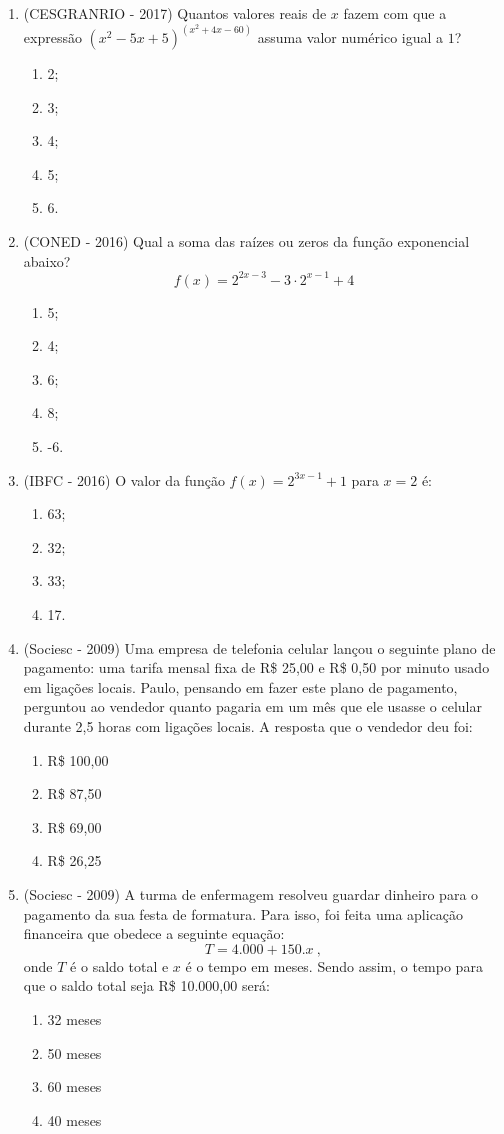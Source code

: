 \begin{enumerate}
\item (CESGRANRIO - 2017) Quantos valores reais de $x$ fazem com que a expressão $(x^2 - 5x + 5)^{(x^2 + 4x - 60)}$ assuma valor numérico igual a $1$? 
\begin{enumerate}
\item 2;
\item 3;
\item 4;
\item 5;
\item 6.
\end{enumerate}

\item (CONED - 2016) Qual a soma das raízes ou zeros da função exponencial abaixo? 
\[f(x)= 2^{2x-3} - 3 \cdot 2^{x-1} + 4\]

\begin{enumerate}
\item 5;
\item 4;
\item 6;
\item 8;
\item -6.
\end{enumerate}

\item (IBFC - 2016) O valor da função $f(x) = 2^{3x-1} + 1$ para $x = 2$ é:
\begin{enumerate}
\item 63;
\item 32;
\item 33;
\item 17.
\end{enumerate}
 
 \item (Sociesc - 2009) Uma empresa de telefonia celular lançou o seguinte plano de pagamento: uma tarifa mensal fixa de R\$ 25,00 e R\$ 0,50 por minuto usado em ligações locais. Paulo, pensando em fazer este
 plano de pagamento, perguntou ao vendedor quanto pagaria em um mês que ele usasse o celular durante 2,5 horas com ligações locais. A
 resposta que o vendedor deu foi:
 \begin{enumerate}
  \item R\$ 100,00
  \item R\$ 87,50
  \item R\$ 69,00
  \item R\$ 26,25
 \end{enumerate}
 
 \item (Sociesc - 2009) A turma de enfermagem resolveu guardar dinheiro para o pagamento da sua festa de formatura. Para isso, foi feita uma aplicação financeira que obedece a seguinte equação: 
  \[T = 4.000 + 150.x \ ,\]
  onde $T$ é o saldo total e $x$ é o tempo em meses. Sendo assim, o tempo para que o saldo total seja R\$ 10.000,00 será:
  \begin{enumerate}
  \item 32 meses
  \item 50 meses
  \item 60 meses
  \item 40 meses
 \end{enumerate}
 

\end{enumerate}
